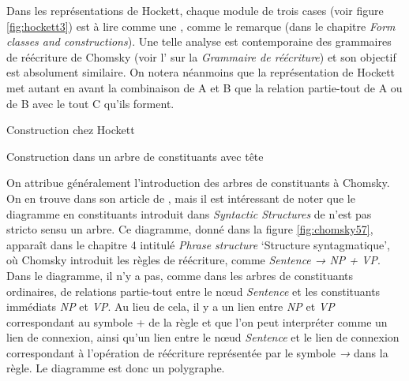 { 
    Dans les représentations de Hockett, chaque module de trois cases (voir figure \ref{fig:hockett3}) est à lire comme une , comme le remarque \citet{hockett1958course} (dans le chapitre \textit{Form classes and constructions}). Une telle analyse est contemporaine des grammaires de réécriture de Chomsky (voir l’ sur la \textit{Grammaire de réécriture}) et son objectif est absolument similaire. On notera néanmoins que la représentation de Hockett met autant en avant la combinaison de A et B que la relation partie-tout de A ou de B avec le tout C qu’ils forment.

    \ea\label{fig:hockett3}
    \ea Construction chez Hockett\smallskip\\
    
    \ex Construction dans un arbre de constituants avec tête\smallskip\\
    \z
    \z
{}    

    On attribue généralement l’introduction des arbres de constituants à Chomsky. On en trouve dans son article de \citeyear{chomsky1955three}, mais il est intéressant de noter que le diagramme en constituants introduit dans \textit{Syntactic Structures} de \citeyear{chomsky1957syntactic} n’est pas stricto sensu un arbre. Ce diagramme, donné dans la figure \ref{fig:chomsky57}, apparaît dans le chapitre 4 intitulé \textit{Phrase structure} ‘Structure syntagmatique’, où Chomsky introduit les règles de réécriture, comme \textit{Sentence → NP + VP}. Dans le diagramme, il n’y a pas, comme dans les arbres de constituants ordinaires, de relations partie-tout entre le nœud \textit{Sentence} et les constituants immédiats \textit{NP} et \textit{VP}. Au lieu de cela, il y a un lien entre \textit{NP} et \textit{VP} correspondant au symbole + de la règle et que l’on peut interpréter comme un lien de connexion, ainsi qu’un lien entre le nœud \textit{Sentence} et le lien de connexion correspondant à l’opération de réécriture représentée par le symbole \textit{→} dans la règle. Le diagramme est donc un polygraphe.

}
